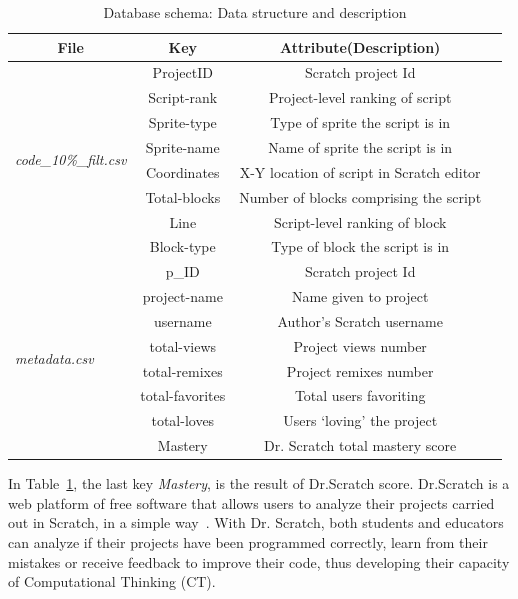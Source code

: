 \documentclass[a4paper,twocolumn,10pt]{article}
\begin{document}
\begin{table}
  \centering\renewcommand{\arraystretch}{1.2}
   \begin{tabular}{@{}lccc@{}}
    \toprule
    \multicolumn{1}{c}{\textbf{File}} & \textbf{Key} &\textbf{Attribute(Description)} \\
    \midrule
    \multirow{8}{*}{\textit{code\_10\%\_filt.csv}} & ProjectID & Scratch project Id \\
                & Script-rank & Project-level ranking of script \\
                & Sprite-type & Type of sprite the script is in\\
                & Sprite-name & Name of sprite the script is in\\
                & Coordinates & X-Y location of script in Scratch editor\\
                & Total-blocks & Number of blocks comprising the script \\
                & Line & Script-level ranking of block \\
                & Block-type & Type of block the script is in\\
    \hline
    \multirow{8}{*}{\textit{metadata.csv}} & p\_ID & Scratch project Id \\
                & project-name & Name given to project \\
                & username & Author’s Scratch username\\
                & total-views & Project views number \\
                & total-remixes & Project remixes number \\
                & total-favorites & Total users favoriting \\
                & total-loves & Users ‘loving’ the project \\
                & Mastery & Dr. Scratch total mastery score\\
    \bottomrule
    \end{tabular}
    \caption{Database schema: Data structure and description}
    \label{tab:schema}
\end{table}


In Table~\ref{tab:schema}, the last key \textit{Mastery}, is the result of Dr.Scratch
score. Dr.Scratch is a web platform of free software that allows users to analyze their projects 
carried out in Scratch, in a simple way~\cite{moreno2015dr}. With Dr. Scratch, both students and
educators can analyze if their projects have been programmed correctly, learn from their mistakes or
receive feedback to improve their code, thus developing their capacity of
Computational Thinking (CT).
\end{document}
